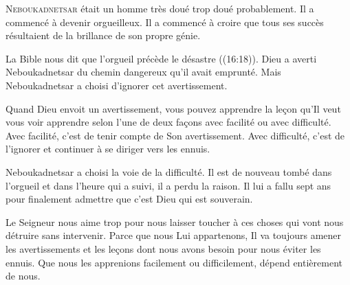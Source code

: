 


\lettrine{N}{eboukadnetsar} était un homme très doué
 \ocadr trop doué probablement. Il a commencé à devenir orgueilleux.
 Il a commencé à croire que tous ses succès résultaient de la brillance
 de son propre génie. 

La Bible nous dit que \Og l'orgueil précède le désastre \Fg{}
 ((16:18)).
 Dieu a averti Neboukadnetsar du chemin dangereux qu'il avait emprunté.
 Mais Neboukadnetsar a choisi d'ignorer cet avertissement. 


Quand Dieu envoit un avertissement, vous pouvez apprendre la le\c{c}on
 qu'Il veut vous voir apprendre selon l'une de deux fa\c{c}ons\frcolon{}
 avec facilité ou avec difficulté. Avec facilité,
 c'est de tenir compte de Son avertissement. Avec difficulté,
 c'est de l'ignorer et continuer à se diriger vers les ennuis. 

Neboukadnetsar a choisi la voie de la difficulté.
 Il est de nouveau tombé dans l'orgueil et dans l'heure qui a suivi,
 il a perdu la raison. Il lui a fallu sept ans pour finalement admettre
 que c'est  Dieu qui est souverain. 

Le Seigneur nous aime trop pour nous laisser toucher à ces choses
 qui vont nous détruire sans intervenir. Parce que nous Lui appartenons,
 Il va toujours amener les avertissements et les le\c{c}ons
 dont nous avons besoin pour nous éviter les ennuis.
 Que nous les apprenions facilement ou difficilement,
 dépend entièrement de nous. 

\dvrule





